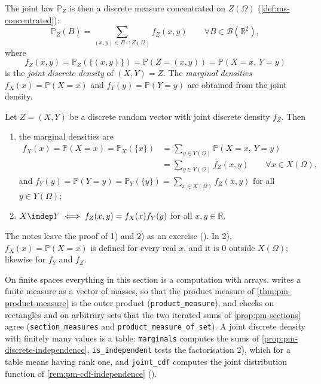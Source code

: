 The joint law $\mathbb P_Z$ is then a discrete measure concentrated on $Z(\Omega)$
(\cref{def:ms-concentrated}):
\[
  \mathbb P_Z(B)=\sum_{(x,y)\in B\cap Z(\Omega)}f_Z(x,y)\qquad\forall B\in\mathcal B(\mathbb R^2),
\]
where
\[
  f_Z(x,y)=\mathbb P_Z(\{(x,y)\})=\mathbb P(Z=(x,y))=\mathbb P(X=x,\,Y=y)
\]
is the \emph{joint discrete density} of $(X,Y)=Z$. The \emph{marginal densities}
$f_X(x)=\mathbb P(X=x)$ and $f_Y(y)=\mathbb P(Y=y)$ are obtained from the joint density.

\begin{proposition}\label{prop:pm-discrete-independence}
Let $Z=(X,Y)$ be a discrete random vector with joint discrete density $f_Z$. Then
\begin{enumerate}[label=\arabic*)]
  \item the marginal densities are
    \[
    \begin{aligned}
      f_X(x)=\mathbb P(X=x)=\mathbb P_X(\{x\})&=\sum_{y\in Y(\Omega)}\mathbb P(X=x,\,Y=y)\\
      &=\sum_{y\in Y(\Omega)}f_Z(x,y)\qquad\forall x\in X(\Omega),
    \end{aligned}
    \]
    and $f_Y(y)=\mathbb P(Y=y)=\mathbb P_Y(\{y\})=\sum_{x\in X(\Omega)}f_Z(x,y)$ for all
    $y\in Y(\Omega)$;
  \item $X\indep Y\iff f_Z(x,y)=f_X(x)f_Y(y)$ for all $x,y\in\mathbb R$.
\end{enumerate}
\end{proposition}

The notes leave the proof of 1) and 2) as an exercise (). In 2),
$f_X(x)=\mathbb P(X=x)$ is defined for every real $x$, and it is $0$ outside $X(\Omega)$;
likewise for $f_Y$ and $f_Z$.

\begin{remark}[computational]\label{rem:pm-code-tables}
On finite spaces everything in this section is a computation with arrays.
 writes a finite measure as a vector of masses, so that
the product measure of \cref{thm:pm-product-measure} is the outer product
(\texttt{product\_measure}), and checks on rectangles and on arbitrary sets that the two
iterated sums of \cref{prop:pm-sections} agree (\texttt{section\_measures} and
\texttt{product\_measure\_of\_set}). A joint discrete
density with finitely many values is a table: \texttt{marginals} computes the sums of
\cref{prop:pm-discrete-independence}, \texttt{is\_independent} tests the factorisation 2),
which for a table means having rank one, and \texttt{joint\_cdf} computes the joint
distribution function of \cref{rem:pm-cdf-independence}
().
\end{remark}

